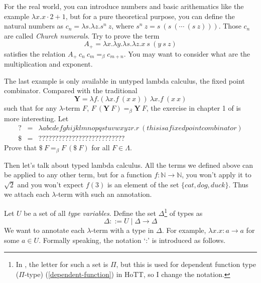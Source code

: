 For the real world, you can introduce numbers and basic arithematics like
the example $\lambda x. x \cdot 2 + 1$, but for a pure theoretical 
purpose, you can define the natural numbers as $c_n=\lambda s.\lambda z. s^n\ z$, 
where $s^n\ z = s\ (s\ (\cdots\ (s\ z)))$. Those $c_n$ are called {\it
Church numerals}. Try to prove the term $$A_+=\lambda x.\lambda y.
\lambda s.\lambda z.x\ s\ (y\ s\ z)$$ satisfies the relation 
$A_+\ c_n\ c_m=_\beta c_{m+n}$. You may want to consider what are the 
multiplication and exponent. 

The last example is only available in untyped lambda calculus, the fixed 
point combinator. Compared with the traditional 
\newcommand{\Ycomb}{\mathbf{Y}}
$$\Ycomb = \lambda f.(\lambda x.f\ (x\ x))\ \lambda x.f\ (x\ x)$$
such that for any $\lambda$-term $F$, 
$F\ (\Ycomb\ F)=_\beta \Ycomb\ F$, the exercise in chapter 1 of 
\cite{Curry-Howard} is more interesting. Let
$$
\begin{array}{lll}
    ? &=& \lambda abcdefghijklmnopqstuvwxyzr.r\ (thisisafixedpointcombinator) \\
    \$ &=& ??????????????????????????
\end{array}
$$
Prove that $\$\ F=_\beta F\ (\$\ F)$ for all $F\in\Lambda$.

Then let's talk about typed lambda calculus. All the terms we defined
above can be applied to any other term, but for a function 
$f: \mathbb{N}\to\mathbb{N}$, you won't apply it to $\sqrt 2$ and 
you won't expect $f(3)$ is an element of the set $\{cat,dog,duck\}$.
Thus we attach each $\lambda$-term with such an annotation. 

Let $U$ be a set of all {\it type variables}. Define the set 
$\Delta$\footnote{In \cite{Curry-Howard}, the letter for such a set is
$\Pi$, but this is used for dependent function type ($\Pi$-type) 
(\autoref{dependent-function}) in HoTT, so I change the notation.} of
types as
$$
    \Delta ::= U \mid \Delta \to \Delta
$$
We want to annotate each $\lambda$-term with a type in $\Delta$. 
For example, $\lambda x. x: a\to a$ for some $a\in U$. Formally speaking, 
the notation `:' is introduced as follows. 

